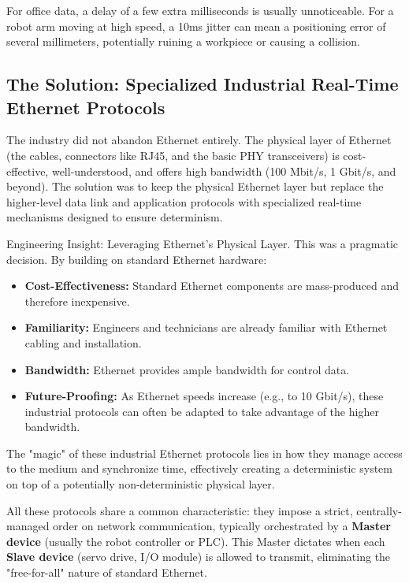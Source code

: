 For office data, a delay of a few extra milliseconds is usually unnoticeable. For a robot arm moving at high speed, a 10ms jitter can mean a positioning error of several millimeters, potentially ruining a workpiece or causing a collision.

\subsection{The Solution: Specialized Industrial Real-Time Ethernet Protocols}
\label{subsec:industrial_ethernet_solution}

The industry did not abandon Ethernet entirely. The physical layer of Ethernet (the cables, connectors like RJ45, and the basic PHY transceivers) is cost-effective, well-understood, and offers high bandwidth (100 Mbit/s, 1 Gbit/s, and beyond). The solution was to keep the physical Ethernet layer but replace the higher-level data link and application protocols with specialized real-time mechanisms designed to ensure determinism.

\begin{principlebox}{Engineering Insight: Leveraging Ethernet's Physical Layer.}
    This was a pragmatic decision. By building on standard Ethernet hardware:
    \begin{itemize}
        \item \textbf{Cost-Effectiveness:} Standard Ethernet components are mass-produced and therefore inexpensive.
        \item \textbf{Familiarity:} Engineers and technicians are already familiar with Ethernet cabling and installation.
        \item \textbf{Bandwidth:} Ethernet provides ample bandwidth for control data.
        \item \textbf{Future-Proofing:} As Ethernet speeds increase (e.g., to 10 Gbit/s), these industrial protocols can often be adapted to take advantage of the higher bandwidth.
    \end{itemize}
    The "magic" of these industrial Ethernet protocols lies in how they manage access to the medium and synchronize time, effectively creating a deterministic system on top of a potentially non-deterministic physical layer.
\end{principlebox}

All these protocols share a common characteristic: they impose a strict, centrally-managed order on network communication, typically orchestrated by a \textbf{Master device} (usually the robot controller or PLC). This Master dictates when each \textbf{Slave device} (servo drive, I/O module) is allowed to transmit, eliminating the "free-for-all" nature of standard Ethernet.

